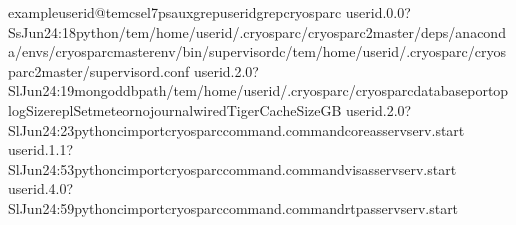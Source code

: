\documentclass[a4paper,11pt,english]{sphinxmanual}
\begin{document}
\begin{sphinxVerbatim}[commandchars=\\\{\}]
exampleuserid@tem\PYGZhy{}cs\PYGZhy{}el7\PYGZdl{}\PYGZgt{}psauxgrep\PYGZlt{}userid\PYGZgt{}grepcryosparc
userid.0.0?SsJun24:18python/tem/home/userid/.cryosparc/cryosparc2\PYGZus{}master/deps/anaconda/envs/cryosparc\PYGZus{}master\PYGZus{}env/bin/supervisord\PYGZhy{}c/tem/home/userid/.cryosparc/cryosparc2\PYGZus{}master/supervisord.conf
userid.2.0?SlJun24:19mongod\PYGZhy{}\PYGZhy{}dbpath/tem/home/userid/.cryosparc/cryosparc\PYGZus{}database\PYGZhy{}\PYGZhy{}port\PYGZhy{}\PYGZhy{}oplogSize\PYGZhy{}\PYGZhy{}replSetmeteor\PYGZhy{}\PYGZhy{}nojournal\PYGZhy{}\PYGZhy{}wiredTigerCacheSizeGB
userid.2.0?SlJun24:23python\PYGZhy{}cimportcryosparc\PYGZus{}command.command\PYGZus{}coreasservserv.start
userid.1.1?SlJun24:53python\PYGZhy{}cimportcryosparc\PYGZus{}command.command\PYGZus{}visasservserv.start
userid.4.0?SlJun24:59python\PYGZhy{}cimportcryosparc\PYGZus{}command.command\PYGZus{}rtpasservserv.start

\end{sphinxVerbatim}
\end{document}

